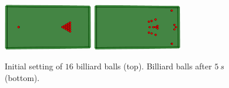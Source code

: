\begin{figure}[h]
	\centering
	\includegraphics[width=0.35\textwidth]{figures/billiardTableInitial.png}
    \includegraphics[width=0.35\textwidth]{figures/billiardTable.png}
	\caption{Initial setting of $16$ billiard balls (top). Billiard balls after $5~s$ (bottom).}
	\label{fig:billiardTable}
\end{figure}
\begin{table}[h]
	\begin{center}
\label{table:billiardTableMaterials} 
	\end{center}
\end{table}
%











